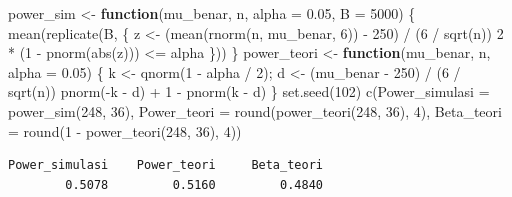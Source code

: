 \documentclass[
  indonesian,
  letterpaper,
]{book}
\newenvironment{Shaded}{\begin{snugshade}}{\end{snugshade}}
\newcommand{\AttributeTok}[1]{\textcolor[rgb]{0.40,0.45,0.13}{#1}}
\newcommand{\ControlFlowTok}[1]{\textcolor[rgb]{0.00,0.23,0.31}{\textbf{#1}}}
\newcommand{\DecValTok}[1]{\textcolor[rgb]{0.68,0.00,0.00}{#1}}
\newcommand{\FloatTok}[1]{\textcolor[rgb]{0.68,0.00,0.00}{#1}}
\newcommand{\FunctionTok}[1]{\textcolor[rgb]{0.28,0.35,0.67}{#1}}
\newcommand{\NormalTok}[1]{\textcolor[rgb]{0.00,0.23,0.31}{#1}}
\newcommand{\OtherTok}[1]{\textcolor[rgb]{0.00,0.23,0.31}{#1}}
\newcommand{\SpecialCharTok}[1]{\textcolor[rgb]{0.37,0.37,0.37}{#1}}
\begin{document}
\begin{Shaded}
\begin{Highlighting}[]
\NormalTok{power\_sim }\OtherTok{\textless{}{-}} \ControlFlowTok{function}\NormalTok{(mu\_benar, n, }\AttributeTok{alpha =} \FloatTok{0.05}\NormalTok{, }\AttributeTok{B =} \DecValTok{5000}\NormalTok{) \{}
  \FunctionTok{mean}\NormalTok{(}\FunctionTok{replicate}\NormalTok{(B, \{}
\NormalTok{    z }\OtherTok{\textless{}{-}}\NormalTok{ (}\FunctionTok{mean}\NormalTok{(}\FunctionTok{rnorm}\NormalTok{(n, mu\_benar, }\DecValTok{6}\NormalTok{)) }\SpecialCharTok{{-}} \DecValTok{250}\NormalTok{) }\SpecialCharTok{/}\NormalTok{ (}\DecValTok{6} \SpecialCharTok{/} \FunctionTok{sqrt}\NormalTok{(n))}
    \DecValTok{2} \SpecialCharTok{*}\NormalTok{ (}\DecValTok{1} \SpecialCharTok{{-}} \FunctionTok{pnorm}\NormalTok{(}\FunctionTok{abs}\NormalTok{(z))) }\SpecialCharTok{\textless{}=}\NormalTok{ alpha}
\NormalTok{  \}))}
\NormalTok{\}}
\NormalTok{power\_teori }\OtherTok{\textless{}{-}} \ControlFlowTok{function}\NormalTok{(mu\_benar, n, }\AttributeTok{alpha =} \FloatTok{0.05}\NormalTok{) \{}
\NormalTok{  k }\OtherTok{\textless{}{-}} \FunctionTok{qnorm}\NormalTok{(}\DecValTok{1} \SpecialCharTok{{-}}\NormalTok{ alpha }\SpecialCharTok{/} \DecValTok{2}\NormalTok{); d }\OtherTok{\textless{}{-}}\NormalTok{ (mu\_benar }\SpecialCharTok{{-}} \DecValTok{250}\NormalTok{) }\SpecialCharTok{/}\NormalTok{ (}\DecValTok{6} \SpecialCharTok{/} \FunctionTok{sqrt}\NormalTok{(n))}
  \FunctionTok{pnorm}\NormalTok{(}\SpecialCharTok{{-}}\NormalTok{k }\SpecialCharTok{{-}}\NormalTok{ d) }\SpecialCharTok{+} \DecValTok{1} \SpecialCharTok{{-}} \FunctionTok{pnorm}\NormalTok{(k }\SpecialCharTok{{-}}\NormalTok{ d)}
\NormalTok{\}}
\FunctionTok{set.seed}\NormalTok{(}\DecValTok{102}\NormalTok{)}
\FunctionTok{c}\NormalTok{(}\AttributeTok{Power\_simulasi =} \FunctionTok{power\_sim}\NormalTok{(}\DecValTok{248}\NormalTok{, }\DecValTok{36}\NormalTok{), }\AttributeTok{Power\_teori =} \FunctionTok{round}\NormalTok{(}\FunctionTok{power\_teori}\NormalTok{(}\DecValTok{248}\NormalTok{, }\DecValTok{36}\NormalTok{), }\DecValTok{4}\NormalTok{),}
  \AttributeTok{Beta\_teori =} \FunctionTok{round}\NormalTok{(}\DecValTok{1} \SpecialCharTok{{-}} \FunctionTok{power\_teori}\NormalTok{(}\DecValTok{248}\NormalTok{, }\DecValTok{36}\NormalTok{), }\DecValTok{4}\NormalTok{))}
\end{Highlighting}
\end{Shaded}

\begin{verbatim}
Power_simulasi    Power_teori     Beta_teori 
        0.5078         0.5160         0.4840 
\end{verbatim}
\end{document}

